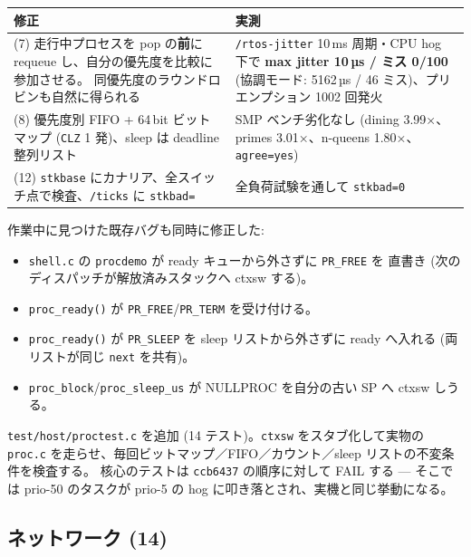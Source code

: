 \documentclass[a4paper,11pt]{ltjsarticle}
\begin{document}
\begin{center}\small
\begin{tabular}{@{}p{7.4cm} p{7.4cm}@{}}
\toprule
\textbf{修正} & \textbf{実測}\\ \midrule
(7) 走行中プロセスを pop の\textbf{前}に requeue し、自分の優先度を比較に参加させる。
    同優先度のラウンドロビンも自然に得られる
  & \texttt{/rtos-jitter} 10\,ms 周期・CPU hog 下で\newline
    \textbf{max jitter 10\,µs / ミス 0/100}\newline
    (協調モード: 5162\,µs / 46 ミス)、プリエンプション 1002 回発火\\
(8) 優先度別 FIFO + 64\,bit ビットマップ (\texttt{CLZ} 1 発)、sleep は deadline 整列リスト
  & SMP ベンチ劣化なし (dining 3.99×、primes 3.01×、n-queens 1.80×、\texttt{agree=yes})\\
(12) \texttt{stkbase} にカナリア、全スイッチ点で検査、\texttt{/ticks} に \texttt{stkbad=}
  & 全負荷試験を通して \texttt{stkbad=0}\\
\bottomrule
\end{tabular}
\end{center}

作業中に見つけた既存バグも同時に修正した:

\begin{itemize}[leftmargin=1.4em,itemsep=2pt]
\item \texttt{shell.c} の \texttt{procdemo} が ready キューから外さずに \texttt{PR\_FREE} を
      直書き (次のディスパッチが解放済みスタックへ ctxsw する)。
\item \texttt{proc\_ready()} が \texttt{PR\_FREE}/\texttt{PR\_TERM} を受け付ける。
\item \texttt{proc\_ready()} が \texttt{PR\_SLEEP} を sleep リストから外さずに ready へ入れる
      (両リストが同じ \texttt{next} を共有)。
\item \texttt{proc\_block}/\texttt{proc\_sleep\_us} が NULLPROC を自分の古い SP へ ctxsw しうる。
\end{itemize}

\texttt{test/host/proctest.c} を追加 (14 テスト)。\texttt{ctxsw} をスタブ化して実物の
\texttt{proc.c} を走らせ、毎回ビットマップ／FIFO／カウント／sleep リストの不変条件を検査する。
核心のテストは \texttt{ccb6437} の順序に対して FAIL する --- そこでは prio-50 のタスクが
prio-5 の hog に叩き落とされ、実機と同じ挙動になる。

\subsection{ネットワーク (14)}
\end{document}
